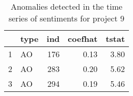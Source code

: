 % 
\begin{table}
\centering
\caption{Anomalies detected in the time series of sentiments for project 9}
\begin{tabular}{rlrrr}
  \hline
 & type & ind & coefhat & tstat \\ 
  \hline
1 & AO & 176 & 0.13 & 3.80 \\ 
  2 & AO & 283 & 0.20 & 5.62 \\ 
  3 & AO & 294 & 0.19 & 5.46 \\ 
   \hline
\end{tabular}
\end{table}